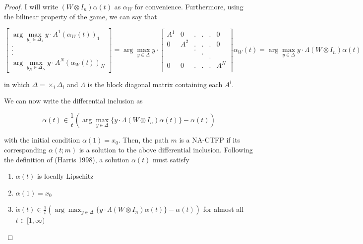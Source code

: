 \documentclass{article}
\theoremstyle{definition}
\begin{document}
\begin{proof}
    I will write $(W \otimes I_n) \alpha(t)$ as $\alpha_W$ for convenience. Furthermore, using
    the bilinear property of the game, we can say that

    \begin{equation}
      \begin{bmatrix}
        \arg\max_{y_1 \in \Delta_1} y \cdot A^1 ( \alpha_W(t))_1 \\
        .\\
        .\\
        .\\
        \arg \max_{y_N \in \Delta_N} y \cdot A^N (\alpha_W(t))_N 
      \end{bmatrix} = 
      \arg \max_{y \in \Delta} y \cdot \begin{bmatrix}
        A^1 & 0 & . & . & . & 0 \\
        0 & A^2 & . & . & . & 0 \\
        & & . & & & \\
        & & & . & & \\
        & & & & . & \\
        0 & 0 & . & . & . & A^N \\
      \end{bmatrix} \alpha_W(t) = \arg\max_{y \in \Delta} y \cdot \Lambda (W \otimes I_n)
      \alpha(t)
    \end{equation}

    in which $\Delta = \times_i \Delta_i$ and $\Lambda$ is the block diagonal matrix containing
    each $A^i$. 

    We can now write the differential inclusion as

    \begin{equation}
      \dot{\alpha}(t) \in \frac{1}{t} (\arg \max_{y \in \Delta}  \{y \cdot \Lambda (W \otimes
      I_n)
      \alpha(t) \}- \alpha(t))
    \end{equation}

    with the initial condition $\alpha(1) = x_0$. Then, the path $m$ is a NA-CTFP if its
    corresponding $\alpha(t; m)$ is a solution to the above differential inclusion. Following
    the definition of (Harris 1998), a solution $\alpha(t)$ must satisfy

    \begin{enumerate}
      \item $\alpha(t)$ is locally Lipschitz
      \item $\alpha(1) = x_0$
      \item $\dot{\alpha}(t) \in \frac{1}{t} (\arg \max_{y \in \Delta}  \{y \cdot \Lambda (W \otimes
      I_n)
      \alpha(t) \}- \alpha(t))$ for almost all $t \in [1, \infty)$ 
    \end{enumerate}


\end{proof}
\end{document}
